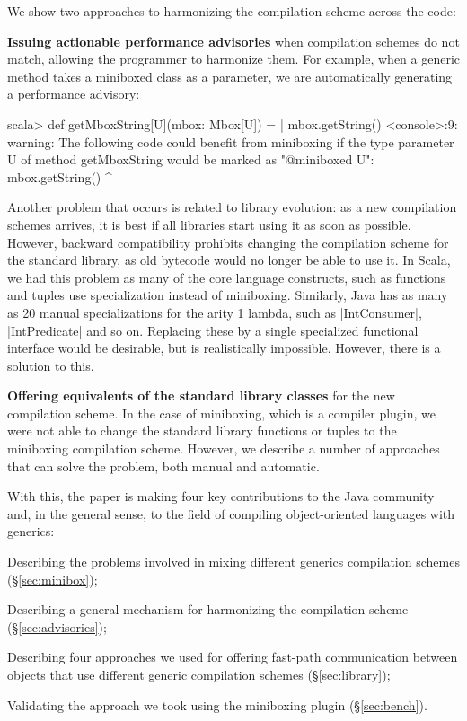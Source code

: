 We show two approaches to harmonizing the compilation scheme across the code:

\textbf{Issuing actionable performance advisories} when compilation schemes do not match, allowing the programmer to harmonize them. For example, when a generic method takes a miniboxed class as a parameter, we are automatically generating a performance advisory:

\begin{lstlisting-nobreak}
scala> def getMboxString[U](mbox: Mbox[U]) =
     |   mbox.getString()
<console>:9: warning: The following code could benefit
from miniboxing if the type parameter U of method
getMboxString would be marked as "@miniboxed U":
         mbox.getString()
         ^
\end{lstlisting-nobreak}

Another problem that occurs is related to library evolution: as a new compilation schemes arrives, it is best if all libraries start using it as soon as possible. However, backward compatibility prohibits changing the compilation scheme for the standard library, as old bytecode would no longer be able to use it. In Scala, we had this problem as many of the core language constructs, such as functions and tuples use specialization instead of miniboxing. Similarly, Java has as many as 20 manual specializations for the arity 1 lambda, such as |IntConsumer|, |IntPredicate| and so on. Replacing these by a single specialized functional interface would be desirable, but is realistically impossible. However, there is a solution to this.

\textbf{Offering equivalents of the standard library classes} for the new compilation scheme. In the case of miniboxing, which is a compiler plugin, we were not able to change the standard library functions or tuples to the miniboxing compilation scheme. However, we describe a number of approaches that can solve the problem, both manual and automatic.

With this, the paper is making four key contributions to the Java community and, in the general sense, to the field of compiling object-oriented languages with generics:

\begin{compactitem}
  \item Describing the problems involved in mixing different generics compilation schemes (\S\ref{sec:minibox});
  \item Describing a general mechanism for harmonizing the compilation scheme (\S\ref{sec:advisories});
  \item Describing four approaches we used for offering fast-path communication between objects that use different generic compilation schemes (\S\ref{sec:library});
  \item Validating the approach we took using the miniboxing plugin (\S\ref{sec:bench}).
\end{compactitem}












